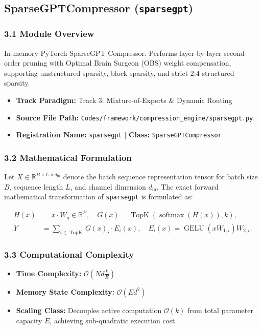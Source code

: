 \subsection{SparseGPTCompressor (\texttt{sparsegpt})}
\label{sec:app_module_sparsegpt}

\subsubsection*{3.1 Module Overview}
In-memory PyTorch SparseGPT Compressor.  Performs layer-by-layer second-order pruning with Optimal Brain Surgeon (OBS) weight compensation, supporting unstructured sparsity, block sparsity, and strict 2:4 structured sparsity.
\begin{itemize}
    \item \textbf{Track Paradigm:} Track 3: Mixture-of-Experts & Dynamic Routing
    \item \textbf{Source File Path:} \texttt{Codes/framework/compression\_engine/sparsegpt.py}
    \item \textbf{Registration Name:} \texttt{sparsegpt} $\mid$ \textbf{Class:} \texttt{SparseGPTCompressor}
\end{itemize}

\subsubsection*{3.2 Mathematical Formulation}
Let $X \in \mathbb{R}^{B \times L \times d_{\text{in}}}$ denote the batch sequence representation tensor for batch size $B$, sequence length $L$, and channel dimension $d_{\text{in}}$. The exact forward mathematical transformation of \texttt{sparsegpt} is formulated as:

\begin{align}
H(x) &= x \cdot W_g \in \mathbb{R}^{E}, \quad G(x) = \operatorname{TopK}\left(\operatorname{softmax}(H(x)), k\right), \\
Y &= \sum_{i \in \operatorname{TopK}} G(x)_i \cdot E_i(x), \quad E_i(x) = \operatorname{GELU}(x W_{1, i}) W_{2, i}.
\end{align}


\subsubsection*{3.3 Computational Complexity}
\begin{itemize}
    \item \textbf{Time Complexity:} $\mathcal{O}(N d \frac{k}{E})$
    \item \textbf{Memory State Complexity:} $\mathcal{O}(E d^2)$
    \item \textbf{Scaling Class:} Decouples active computation $\mathcal{O}(k)$ from total parameter capacity $E$, achieving sub-quadratic execution cost.
\end{itemize}

